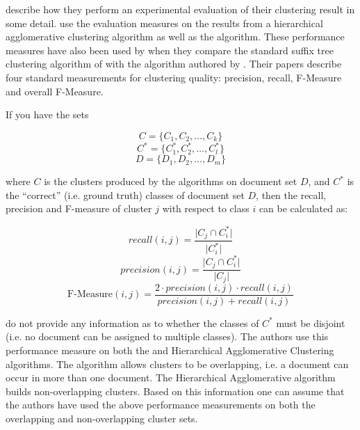 \cite{Chim2007} describe how they perform an experimental evaluation of their clustering result in some detail. \citeauthor{Chim2007} use the evaluation measures on the results from a hierarchical agglomerative clustering algorithm as well as the \STC algorithm. These performance measures have also been used by \cite{Rafi2011} when they compare the standard suffix tree clustering algorithm of \citeauthor{Oren1998} with the algorithm authored by \citeauthor{Chim2008}. Their papers describe four standard measurements for clustering quality: precision, recall, F-Measure and overall F-Measure.

If you have the sets

\begin{displaymath}
C = \{C_{1}, C_{2}, \dots, C_{k}\}
\end{displaymath}
\begin{displaymath}
C^* = \{C_1^*, C_2^*, \dots, C_l^*\}
\end{displaymath}
\begin{displaymath}
D = \{D_{1}, D_{2}, \dots, D_{m}\}
\end{displaymath}

where \(C\) is the clusters produced by the algorithms on document set \(D\), and \(C^*\) is the ``correct'' (i.e. ground truth) classes of document set \(D\), then the recall, precision and F-measure of cluster \(j\) with respect to class \(i\) can be calculated as:

\begin{displaymath}
recall(i,j) = \frac{\vert C_{j} \cap C_i^* \vert}{\vert C_i^* \vert}
\end{displaymath}
\begin{displaymath}
precision(i,j) = \frac{\vert C_{j} \cap C_i^* \vert}{\vert C_{j} \vert}
\end{displaymath}
\begin{displaymath}
\text{F-Measure}(i,j) = \frac{2 \cdot precision(i,j) \cdot recall(i,j)}{precision(i,j) + recall(i,j)}
\end{displaymath}

\cite{Chim2007} do not provide any information as to whether the classes of \(C^*\) must be disjoint (i.e. no document can be assigned to multiple classes). The authors use this performance measure on both the \STC and Hierarchical Agglomerative Clustering algorithms. The \STC algorithm allows clusters to be overlapping, i.e. a document can occur in more than one document. The Hierarchical Agglomerative algorithm builds non-overlapping clusters. Based on this information one can assume that the authors have used the above performance measurements on both the overlapping and non-overlapping cluster sets.

